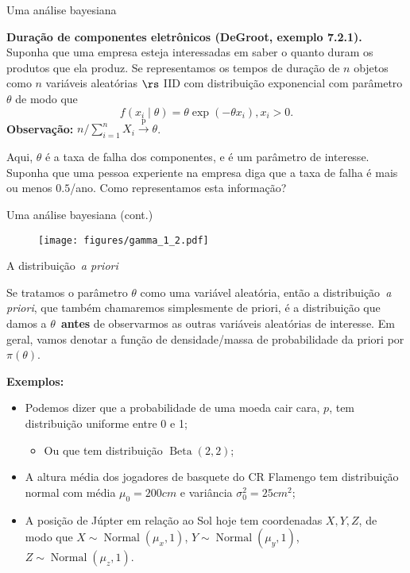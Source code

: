 \begin{frame}{Uma análise bayesiana}
\begin{exemplo}
\label{ex:duracao_componentes}
\textbf{Duração de componentes eletrônicos (DeGroot, exemplo 7.2.1).}
Suponha que uma empresa esteja interessadas em saber o quanto duram os produtos que ela produz.
Se representamos os tempos de duração de $n$ objetos como $n$ variáveis aleatórias $\rs$ IID com distribuição exponencial com parâmetro $\theta$ de modo que
$$f(x_i \mid \theta) = \theta \exp(-\theta x_i), x_i > 0.$$
\textbf{Observação:} $n/\sum_{i=1}^n X_i \xrightarrow{\text{p}} \theta$.

Aqui, $\theta$ é a taxa de falha dos componentes, e é um parâmetro de interesse.
Suponha que uma pessoa experiente na empresa diga que a taxa de falha é mais ou menos $0.5$/ano.
Como representamos esta informação?
\end{exemplo} 
\end{frame}
\begin{frame}{Uma análise bayesiana (cont.)}
 \begin{figure}[!ht]
\label{fig:gamma_1_2}
\begin{center}
\texttt{[image: figures/gamma\_1\_2.pdf]} 
\end{center} 
\end{figure} 
\end{frame}
\begin{frame}{A distribuição~\textit{a priori}}
\begin{defn}
\label{def:prior}
 Se tratamos o parâmetro $\theta$ como uma variável aleatória, então a distribuição~\textit{a priori}, que também chamaremos simplesmente de priori, é a distribuição que damos a $\theta$~\textbf{antes} de observarmos as outras variáveis aleatórias de interesse.
 Em geral, vamos denotar a função de densidade/massa de probabilidade da priori por $\pi(\theta)$.
\end{defn}
\textbf{Exemplos:}
\begin{itemize}
 \item Podemos dizer que a probabilidade de uma moeda cair cara, $p$, tem distribuição uniforme entre 0 e 1;
 \begin{itemize}
  \item Ou que tem distribuição $\operatorname{Beta}(2, 2)$;
 \end{itemize}
 \item A altura média dos jogadores de basquete do CR Flamengo tem distribuição normal com média $\mu_0 = 200 cm$ e variância $\sigma_0^2 = 25 cm^2$;
 \item A posição de Júpter em relação ao Sol hoje tem coordenadas $X,Y, Z$, de modo que $X \sim \operatorname{Normal}(\mu_x, 1)$, $Y \sim \operatorname{Normal}(\mu_y, 1)$, $Z \sim \operatorname{Normal}(\mu_z, 1)$.
\end{itemize}
\end{frame}
